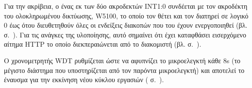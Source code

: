 Για την ακρίβεια, ο ένας εκ των δύο ακροδεκτών INT1:0 συνδέεται με τον ακροδέκτη
 του ολοκληρωμένου δικτύωσης, W5100, το οποίο τον θέτει και τον
διατηρεί σε λογικό 0 έως ότου διευθετηθούν όλες οι ενδείξεις διακοπών που του
έχουν ενεργοποιηθεί
(βλ.  σ.~\pageref{subsec:network:interface}).
Για τις ανάγκες της υλοποίησης, αυτό σημαίνει ότι έχει καταφθάσει εισερχόμενο
αίτημα HTTP το οποίο διεκπεραιώνεται από το διακομιστή (βλ.
 σ.~\pageref{sec:http-server}).

Ο χρονομετρητής WDT ρυθμίζεται ώστε να αφυπνίζει το μικροελεγκτή κάθε 8s (το
μέγιστο διάστημα που υποστηρίζεται από τον παρόντα μικροελεγκτή) και αποτελεί το
έναυσμα για την εκκίνηση νέου κύκλου εργασιών
( σ.~\pageref{ssubsec:task:initiate}).







